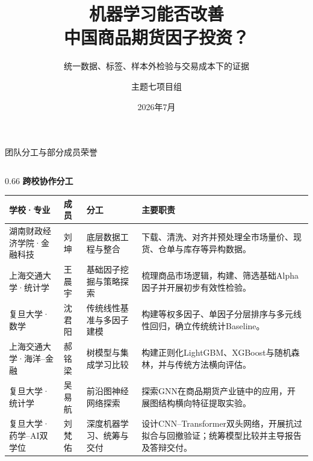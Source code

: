 \documentclass[aspectratio=169,10pt]{beamer}
\title{机器学习能否改善\\中国商品期货因子投资？}
\subtitle{统一数据、标签、样本外检验与交易成本下的证据}
\author{主题七项目组}
\institute{课程项目答辩}
\date{2026年7月}
\begin{document}

\begin{frame}[plain]
  \titlepage
\end{frame}

\begin{frame}{团队分工与部分成员荣誉}
  \vspace{-1mm}
  \begin{columns}[T,onlytextwidth]
    \begin{column}{0.66\textwidth}
      {\scriptsize\bfseries\color{AcademicNavy}跨校协作分工}\par
      \vspace{0.7mm}
      \renewcommand{\arraystretch}{1.08}
      \setlength{\tabcolsep}{2.2pt}
      \begin{tabularx}{\linewidth}{@{}p{1.75cm}p{1.05cm}p{2.45cm}X@{}}
        \toprule
        \tiny\bfseries 学校·专业 & \tiny\bfseries 成员 & \tiny\bfseries 分工 & \tiny\bfseries 主要职责 \\
        \midrule
        \tiny 湖南财政经济学院·金融科技 & \tiny 刘坤 & \tiny 底层数据工程与整合 & \tiny 下载、清洗、对齐并预处理全市场量价、现货、仓单与库存等异构数据。 \\
        \tiny 上海交通大学·统计学 & \tiny 王晨宇 & \tiny 基础因子挖掘与策略探索 & \tiny 梳理商品市场逻辑，构建、筛选基础Alpha因子并开展初步有效性检验。 \\
        \tiny 复旦大学·数学 & \tiny 沈君阳 & \tiny 传统线性基准与多因子建模 & \tiny 构建等权多因子、单因子分层排序与多元线性回归，确立传统统计Baseline。 \\
        \tiny 上海交通大学·海洋--金融 & \tiny 郝铭梁 & \tiny 树模型与集成学习比较 & \tiny 构建正则化LightGBM、XGBoost与随机森林，并与传统方法横向评估。 \\
        \tiny 复旦大学·统计学 & \tiny 吴易航 & \tiny 前沿图神经网络探索 & \tiny 探索GNN在商品期货产业链中的应用，开展图结构横向特征提取实验。 \\
        \tiny 复旦大学·药学--AI双学位 & \tiny 刘梵佑 & \tiny 深度机器学习、统筹与交付 & \tiny 设计CNN--Transformer双头网络，开展抗过拟合与回撤验证；统筹模型比较并主导报告及答辩交付。 \\

\end{tabularx}
\end{column}
\end{columns}
\end{frame}
\end{document}
